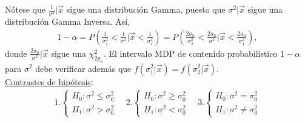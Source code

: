 Nótese que $\frac{1}{\sigma^2} | \vec{x}$ sigue una distribución Gamma, puesto que $\sigma^2 | \vec{x}$ sigue una distribución Gamma Inversa. Así, 
\begin{align*}
    1 - \alpha = P\left( \frac{1}{\sigma_2^2} < \frac{1}{\sigma^2} |  \vec{x} < \frac{1}{\sigma_1^2} \right) = P\left( \frac{2a_n}{\sigma_2^2} < \frac{2a_n}{\sigma^2} |  \vec{x} < \frac{2a_n}{\sigma_1^2} \right),
\end{align*}
donde $\frac{2a_n}{\sigma^2} | \vec{x}$ sigue una $\chi^2_{2p_n}$. El intervalo MDP de contenido probabilístico $1-\alpha$ para $\sigma^2$ debe verificar además que $f(\sigma_1^2 | \vec{x}) = f(\sigma_2^2 | \vec{x})$.
\\
\newline
\noindent \underline{Contrastes de hipótesis}:
\begin{align*}
   1. \begin{cases}
        H_0 : \sigma^2 \leq \sigma^2_0 \\
        H_1 : \sigma^2 > \sigma^2_0
    \end{cases} \quad     2.\begin{cases}
        H_0 : \sigma^2 \ge \sigma^2_0 \\
        H_1 : \sigma^2< \sigma^2_0
    \end{cases} \quad     3.\begin{cases}
        H_0 : \sigma^2 = \sigma^2_0 \\
        H_1 : \sigma^2\not = \sigma^2_0
    \end{cases}
\end{align*}

